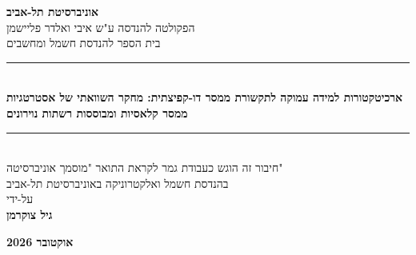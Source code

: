 \documentclass[12pt,a4paper,oneside]{book}
\theoremstyle{definition}
\begin{document}
\begin{titlepage}
\begin{center}
\vspace*{0.5cm}
\begin{otherlanguage}{hebrew}

{\LARGE\textbf{אוניברסיטת תל-אביב}}\\[6pt]
{\large הפקולטה להנדסה ע"ש איבי ואלדר פליישמן}\\[4pt]
{\large בית הספר להנדסת חשמל ומחשבים}\\[1.5cm]

\noindent\rule{\textwidth}{2pt}\\[0.4cm]
{\LARGE\bfseries
ארכיטקטורות למידה עמוקה לתקשורת ממסר דו-קפיצתית: מחקר השוואתי של אסטרטגיות ממסר קלאסיות ומבוססות רשתות נוירונים}\\[6pt]
\noindent\rule{\textwidth}{2pt}\\[1.2cm]

{\large חיבור זה הוגש כעבודת גמר לקראת התואר "מוסמך אוניברסיטה"}\\[4pt]
{\large בהנדסת חשמל ואלקטרוניקה באוניברסיטת תל-אביב}\\[1.5cm]

{\large על-ידי}\\[6pt]
{\Large\bfseries גיל צוקרמן}\\[1.5cm]

\vfill

{\large\textbf{אוקטובר 2026}}\\[1.5cm]

\end{otherlanguage}
\end{center}
\end{titlepage}
\end{document}
